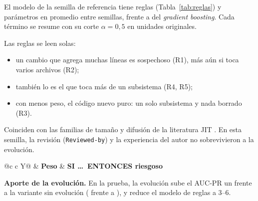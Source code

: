 El modelo de la semilla de referencia tiene \cifNReglasRef{} reglas (Tabla~\ref{tab:reglas}) y \cifParamFE{} parámetros en promedio entre semillas, frente a \cifParamGBprueba{} del \emph{gradient boosting}. Cada término se resume con su corte $\alpha=0{,}5$ en unidades originales.

Las reglas se leen solas:
\begin{itemize}
\item un cambio que agrega muchas líneas es sospechoso (R1), más aún si toca varios archivos (R2);
\item también lo es el que toca más de un subsistema (R4, R5);
\item con menos peso, el código nuevo puro: un solo subsistema y nada borrado (R3).
\end{itemize}
Coinciden con las familias de tamaño y difusión de la literatura JIT \cite{Kamei2013}. En esta semilla, la revisión (\texttt{Reviewed-by}) y la experiencia del autor no sobrevivieron a la evolución.

\begin{table}[!t]
\caption{Base de reglas del difuso-evolutivo (semilla de referencia). Entre paréntesis, el corte $\alpha=0{,}5$ de cada término}
\label{tab:reglas}
\centering\footnotesize
\begin{tabularx}{\columnwidth}{@{}c c Y@{}}
\toprule
\cabecera & \textbf{Peso} & \textbf{SI \ldots\ ENTONCES riesgoso}\\
\midrule
{}
\bottomrule
\end{tabularx}
\end{table}

\textbf{Aporte de la evolución.} En la prueba, la evolución sube el AUC-PR un \cifAporteEvolPrueba{} frente a la variante sin evolución (\cifTestFE{} frente a \cifTestVar{}), y reduce el modelo de \cifReglasVariante{} reglas a 3--6.
